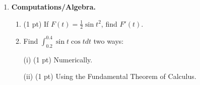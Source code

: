 \documentclass[11pt,letterpaper]{article}
\begin{document}
\begin{enumerate}
\vspace{1.0in}
 (1 pt)  The size of the area A.


\vspace{1.0in}
 (1 pt)  The height of the line L.

\vspace{1.0in}
\item \textbf{Computations/Algebra.}  
\begin{enumerate}
\item  (1 pt) If $F(t)=\frac{1}{2}\sin{t^2}$, find $F'(t)$.

\vspace{5pc}
\item Find $\int_{0.2}^{0.4}\sin{t}\cos{t}dt$ two ways: 

\vspace{.5pc}
(i)  (1 pt) Numerically.  

\vspace{5pc}
(ii)  (1 pt) Using the Fundamental Theorem of Calculus.
\end{enumerate}

\end{enumerate}



\end{document}
